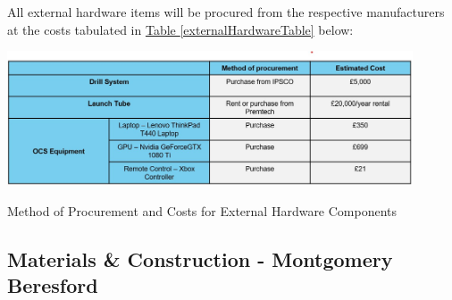 \documentclass[11pt]{article}		%
\newcommand{\tableref}[1]{\hyperref[#1]{Table \ref*{#1}}}     %
\begin{document}
    All external hardware items will be procured from the respective manufacturers at the costs tabulated in \tableref{externalHardwareTable} below:
    			\begin{table}[H]
    	  		    \centering
    	  		    \includegraphics[width=0.9\textwidth]{External Hardware costs.jpg}
    				\caption{Method of Procurement and Costs for External Hardware Components}
    				\label{externalHardwareTable}
    			\end{table}
    		
    		
		\subsection[Materials \& Construction]{Materials \& Construction - Montgomery Beresford}
		
\end{document}
